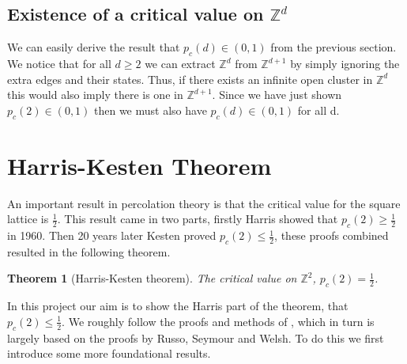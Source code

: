 \documentclass[a4paper,11pt]{article}
\newtheorem{theorem}{Theorem}[section]
\theoremstyle{definition}
\newcommand{\ints}{\mathbb{Z}}
\begin{document}
\subsection {Existence of a critical value on \texorpdfstring{$\ints^d$}{ Zd}}
We can easily derive the result that $p_c(d)\in (0,1)$ from the previous section. 
We notice that for all $d\geq 2$ we can extract $\ints^d$ from $\ints^{d+1}$ by simply ignoring the extra edges and their states.
Thus, if there exists an infinite open cluster in $\ints^d$ this would also imply there is one in $\ints^{d+1}$.
Since we have just shown $p_c(2) \in (0,1)$ then we must also have $p_c(d) \in (0,1)$ for all d.

{\color{red}{TO DO: explain critical value is non-decreasing in d, by coupling argument?}}


\section{Harris-Kesten Theorem}
An important result in percolation theory is that the critical value for the square lattice is $\frac{1}{2}$. 
This result came in two parts, firstly Harris \cite{harris_1960} showed that $p_c(2) \geq \frac{1}{2}$ in 1960.
Then 20 years later Kesten \cite{kesten1980critical} proved $p_c(2) \leq \frac{1}{2}$, these proofs combined resulted in the following theorem.

\begin{theorem}[Harris-Kesten theorem]
	The critical value on $\ints^2$,  $p_c(2) =  \frac{1}{2}$.
\end{theorem}
In this project our aim is to show the Harris part of the theorem, that $p_c(2) \leq \frac{1}{2}$. We roughly follow the proofs and methods of \cite{bollobas2006short}, which in turn is largely based on the proofs by Russo, Seymour and Welsh.
To do this we first introduce some more foundational results.
\end{document}
